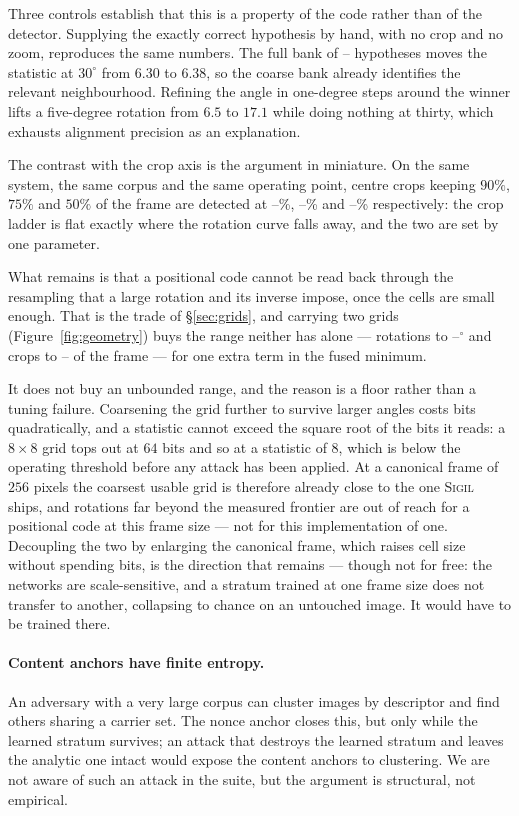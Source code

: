 \documentclass[10pt,twocolumn]{article}
\theoremstyle{definition}
\theoremstyle{remark}
\newcommand{\sigil}{\textsc{Sigil}}
\providecommand{\cropNine}{--}
\providecommand{\cropSevenFive}{--}
\providecommand{\cropFive}{--}
\providecommand{\bestRot}{--}
\providecommand{\bestCrop}{--}
\providecommand{\nhypotheses}{--}
\begin{document}
Three controls establish that this is a property of the code rather than of the
detector. Supplying the exactly correct hypothesis by hand, with no crop and no
zoom, reproduces the same numbers. The full bank of \nhypotheses{} hypotheses
moves the statistic at $30^\circ$ from $6.30$ to $6.38$, so the coarse bank
already identifies the relevant neighbourhood. Refining the angle in one-degree
steps around the winner lifts a
five-degree rotation from $6.5$ to $17.1$ while doing nothing at thirty, which
exhausts alignment precision as an explanation.

The contrast with the crop axis is the argument in miniature. On the same
system, the same corpus and the same operating point, centre crops keeping
$90\%$, $75\%$ and $50\%$ of the frame are detected at \cropNine\%,
\cropSevenFive\% and \cropFive\% respectively: the crop ladder is flat exactly
where the rotation curve falls away, and the two are set by one parameter.

What remains is that a positional code cannot be read back through the
resampling that a large rotation and its inverse impose, once the cells are
small enough. That is the trade of \S\ref{sec:grids}, and carrying two grids
(Figure~\ref{fig:geometry}) buys the range neither has alone --- rotations to
\bestRot$^\circ$ and crops to \bestCrop{} of the frame --- for one extra term in
the fused minimum.

It does not buy an unbounded range, and the reason is a floor rather than a
tuning failure. Coarsening the grid further to survive larger angles costs bits
quadratically, and a statistic cannot exceed the square root of the bits it
reads: a $8\times8$ grid tops out at $64$ bits and so at a statistic of $8$,
which is below the operating threshold before any attack has been applied. At
a canonical frame of $256$ pixels the coarsest usable grid is therefore already
close to the one \sigil{} ships, and rotations far beyond the measured frontier
are out of reach for a positional code at this frame size --- not for this
implementation of one. Decoupling the two by enlarging the canonical frame,
which raises cell size without spending bits, is the direction that remains ---
though not for free: the networks are scale-sensitive, and a stratum trained at
one frame size does not transfer to another, collapsing to chance on an
untouched image. It would have to be trained there.

\paragraph{Content anchors have finite entropy.} An adversary with a very large
corpus can cluster images by descriptor and find others sharing a carrier set.
The nonce anchor closes this, but only while the learned stratum survives; an
attack that destroys the learned stratum and leaves the analytic one intact would
expose the content anchors to clustering. We are not aware of such an attack in
the suite, but the argument is structural, not empirical.
\end{document}
